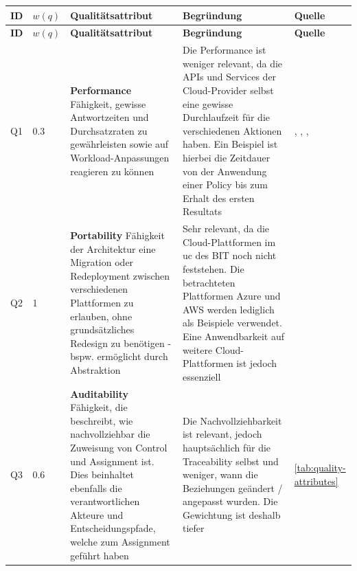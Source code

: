 \begin{longtable}{|
  L{1cm}|
  L{1cm}|
  p{\dimexpr(\textwidth-5cm-10\arrayrulewidth)/2\relax}|
  p{\dimexpr(\textwidth-5cm-10\arrayrulewidth)/2\relax}|
  L{3cm}|
}
    \hline
    \textbf{ID} & \textbf{$w(q)$} & \textbf{Qualitätsattribut} & \textbf{Begründung} & \textbf{Quelle} \\
    \hline
    \endfirsthead

    \hline
    \textbf{ID} & \textbf{$w(q)$} & \textbf{Qualitätsattribut} & \textbf{Begründung} & \textbf{Quelle} \\
    \hline
    \endhead

    Q1 & 0.3 & \textbf{Performance} \hypertarget{quality-q1}{} Fähigkeit, gewisse Antwortzeiten und Durchsatzraten zu gewährleisten sowie auf Workload-Anpassungen reagieren zu können & 
    Die Performance ist weniger relevant, da die APIs und Services der Cloud-Provider selbst eine gewisse Durchlaufzeit für die verschiedenen Aktionen haben. Ein Beispiel ist hierbei die Zeitdauer von der Anwendung einer Policy bis zum Erhalt des ersten Resultats & \cite{papaioannou_architecture_2013}, \cite{bhargav_sai_pillati_leading_2025}, \cite{banijamali_software_2019}, \cite{mohammad_asad_hussain_comparative_2025}
    \\
    \hline

    Q2 & 1 & \textbf{Portability} \hypertarget{quality-q2}{} Fähigkeit der Architektur eine Migration oder Redeployment zwischen verschiedenen Plattformen zu erlauben, ohne grundsätzliches Redesign zu benötigen - bspw. ermöglicht durch Abstraktion &
    Sehr relevant, da die Cloud-Plattformen im \ac{uc} des BIT noch nicht feststehen. Die betrachteten Plattformen Azure und AWS werden lediglich als Beispiele verwendet. Eine Anwendbarkeit auf weitere Cloud-Plattformen ist jedoch essenziell & \cite{mirsalari_model_2020}
    \\
    \hline

    Q3 & 0.6 & \textbf{Auditability} \hypertarget{quality-q3}{} Fähigkeit, die beschreibt, wie nachvollziehbar die Zuweisung von Control und Assignment ist. Dies beinhaltet ebenfalls die verantwortlichen Akteure und Entscheidungspfade, welche zum Assignment geführt haben &
    Die Nachvollziehbarkeit ist relevant, jedoch hauptsächlich für die Traceability selbst und weniger, wann die Beziehungen geändert / angepasst wurden. Die Gewichtung ist deshalb tiefer & \autoref{tab:quality-attributes}
    \\
    \hline


\end{longtable}
